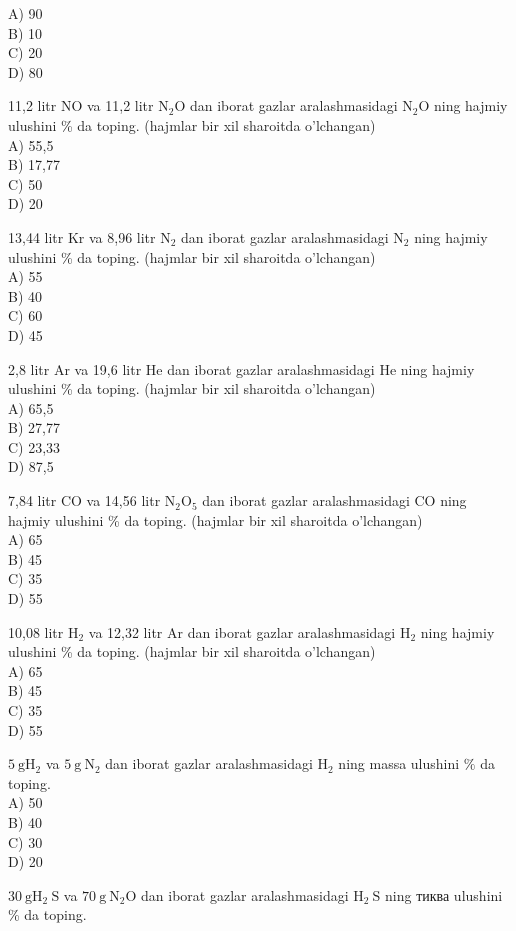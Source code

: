 A) 90\\
B) 10\\
C) 20\\
D) 80
  \item 11,2 litr NO va 11,2 litr $\mathrm{N}_{2} \mathrm{O}$ dan iborat gazlar aralashmasidagi $\mathrm{N}_{2} \mathrm{O}$ ning hajmiy ulushini \% da toping. (hajmlar bir xil sharoitda o'lchangan)\\
A) 55,5\\
B) 17,77\\
C) 50\\
D) 20
  \item 13,44 litr Kr va 8,96 litr $\mathrm{N}_{2}$ dan iborat gazlar aralashmasidagi $\mathrm{N}_{2}$ ning hajmiy ulushini \% da toping. (hajmlar bir xil sharoitda o'lchangan)\\
A) 55\\
B) 40\\
C) 60\\
D) 45
  \item 2,8 litr Ar va 19,6 litr He dan iborat gazlar aralashmasidagi He ning hajmiy ulushini \% da toping. (hajmlar bir xil sharoitda o'lchangan)\\
A) 65,5\\
B) 27,77\\
C) 23,33\\
D) 87,5
  \item 7,84 litr CO va 14,56 litr $\mathrm{N}_{2} \mathrm{O}_{5}$ dan iborat gazlar aralashmasidagi CO ning hajmiy ulushini \% da toping. (hajmlar bir xil sharoitda o'lchangan)\\
A) 65\\
B) 45\\
C) 35\\
D) 55
  \item 10,08 litr $\mathrm{H}_{2}$ va 12,32 litr Ar dan iborat gazlar aralashmasidagi $\mathrm{H}_{2}$ ning hajmiy ulushini \% da toping. (hajmlar bir xil sharoitda o'lchangan)\\
A) 65\\
B) 45\\
C) 35\\
D) 55
  \item $5 \mathrm{~g} \mathrm{H}_{2}$ va $5 \mathrm{~g} \mathrm{~N}_{2}$ dan iborat gazlar aralashmasidagi $\mathrm{H}_{2}$ ning massa ulushini $\%$ da toping.\\
A) 50\\
B) 40\\
C) 30\\
D) 20
  \item $30 \mathrm{~g} \mathrm{H}_{2} \mathrm{~S}$ va $70 \mathrm{~g} \mathrm{~N}_{2} \mathrm{O}$ dan iborat gazlar aralashmasidagi $\mathrm{H}_{2} \mathrm{~S}$ ning тиква ulushini \% da toping.\\

